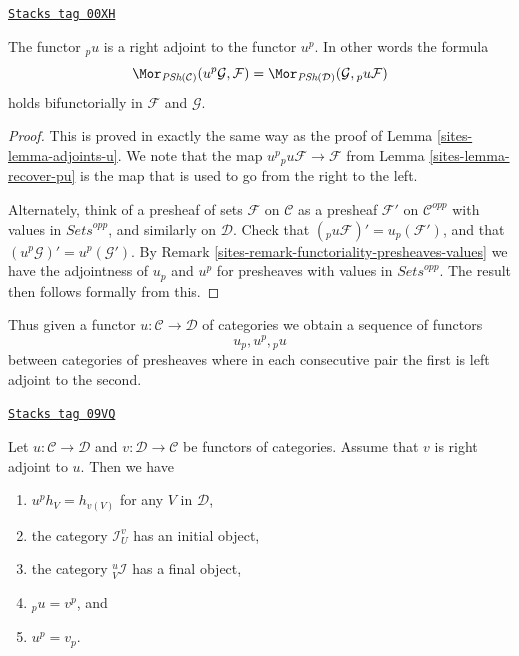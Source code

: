 \begin{lemma}[Adjoints pu]
\label{sites-lemma-adjoints-pu}
\href{https://stacks.math.columbia.edu/tag/00XH}{\texttt{Stacks tag 00XH}}

The functor ${}_pu$ is a right adjoint to the functor $u^p$.
In other words the formula
$$
\Mor_{\textit{PSh}(\mathcal{C})}(u^p\mathcal{G}, \mathcal{F})
=
\Mor_{\textit{PSh}(\mathcal{D})}(\mathcal{G}, {}_pu\mathcal{F})
$$
holds bifunctorially in $\mathcal{F}$ and $\mathcal{G}$.
\end{lemma}

\begin{proof}

This is proved in exactly the same way as the proof
of Lemma \ref{sites-lemma-adjoints-u}. We note that the map
$u^p{}_pu \mathcal{F} \to \mathcal{F}$ from
Lemma \ref{sites-lemma-recover-pu} is the map that
is used to go from the right to the left.

\medskip\noindent
Alternately, think
of a presheaf of sets $\mathcal{F}$ on $\mathcal{C}$ as a presheaf
$\mathcal{F}'$ on $\mathcal{C}^{opp}$ with values in $\textit{Sets}^{opp}$,
and similarly on $\mathcal{D}$.
Check that $({}_pu \mathcal{F})' = u_p(\mathcal{F}')$,
and that $(u^p\mathcal{G})' = u^p(\mathcal{G}')$.
By Remark \ref{sites-remark-functoriality-presheaves-values}
we have the adjointness of $u_p$ and $u^p$ for
presheaves with values in $\textit{Sets}^{opp}$.
The result then follows formally from this.
\end{proof}

Thus given a functor $u : \mathcal{C} \to \mathcal{D}$ of categories
we obtain a sequence of functors
$$
u_p, u^p, {}_pu
$$
between categories of presheaves where in each consecutive pair the
first is left adjoint to the second.

\begin{lemma}
\label{sites-lemma-adjoint-functors}
\href{https://stacks.math.columbia.edu/tag/09VQ}{\texttt{Stacks tag 09VQ}}

Let $u : \mathcal{C} \to \mathcal{D}$ and $v : \mathcal{D} \to \mathcal{C}$
be functors of categories. Assume that $v$ is right adjoint to $u$.
Then we have
\begin{enumerate}
\item $u^ph_V = h_{v(V)}$ for any $V$ in $\mathcal{D}$,
\item the category $\mathcal{I}^v_U$ has an initial object,
\item the category ${}_V^u\mathcal{I}$ has a final object,
\item ${}_pu = v^p$, and
\item $u^p = v_p$.
\end{enumerate}
\end{lemma}

